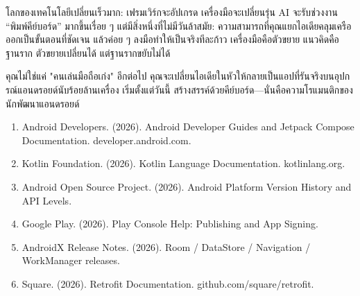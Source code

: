 โลกของเทคโนโลยีเปลี่ยนเร็วมาก: เฟรมเวิร์กจะอัปเกรด เครื่องมือจะเปลี่ยนรุ่น AI จะรับช่วงงาน “พิมพ์คีย์บอร์ด” มากขึ้นเรื่อย ๆ แต่มีสิ่งหนึ่งที่ไม่มีวันล้าสมัย: ความสามารถที่คุณแยกไอเดียคลุมเครือออกเป็นขั้นตอนที่ชัดเจน แล้วค่อย ๆ ลงมือทำให้เป็นจริงทีละก้าว เครื่องมือคือตัวขยาย แนวคิดคือฐานราก ตัวขยายเปลี่ยนได้ แต่ฐานรากขยับไม่ได้

คุณไม่ใช่แค่ "คนเล่นมือถือเก่ง" อีกต่อไป คุณจะเปลี่ยนไอเดียในหัวให้กลายเป็นแอปที่รันจริงบนอุปกรณ์แอนดรอยด์นับร้อยล้านเครื่อง เริ่มตั้งแต่วันนี้ สร้างสรรค์ด้วยคีย์บอร์ด—นั่นคือความโรแมนติกของนักพัฒนาแอนดรอยด์


\begin{enumerate}
  \item Android Developers. (2026). Android Developer Guides and Jetpack Compose Documentation. developer.android.com.
  \item Kotlin Foundation. (2026). Kotlin Language Documentation. kotlinlang.org.
  \item Android Open Source Project. (2026). Android Platform Version History and API Levels.
  \item Google Play. (2026). Play Console Help: Publishing and App Signing.
  \item AndroidX Release Notes. (2026). Room / DataStore / Navigation / WorkManager releases.
  \item Square. (2026). Retrofit Documentation. github.com/square/retrofit.
\end{enumerate}
